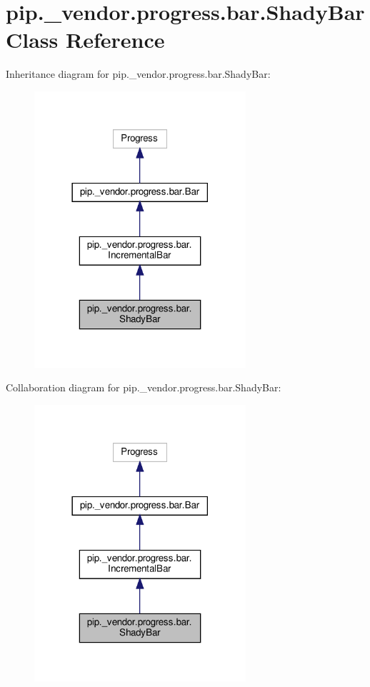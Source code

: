 \hypertarget{classpip_1_1__vendor_1_1progress_1_1bar_1_1ShadyBar}{}\section{pip.\+\_\+vendor.\+progress.\+bar.\+Shady\+Bar Class Reference}
\label{classpip_1_1__vendor_1_1progress_1_1bar_1_1ShadyBar}


Inheritance diagram for pip.\+\_\+vendor.\+progress.\+bar.\+Shady\+Bar\+:
\nopagebreak
\begin{figure}[H]
\begin{center}
\leavevmode
\includegraphics[width=222pt]{classpip_1_1__vendor_1_1progress_1_1bar_1_1ShadyBar__inherit__graph}
\end{center}
\end{figure}


Collaboration diagram for pip.\+\_\+vendor.\+progress.\+bar.\+Shady\+Bar\+:
\nopagebreak
\begin{figure}[H]
\begin{center}
\leavevmode
\includegraphics[width=222pt]{classpip_1_1__vendor_1_1progress_1_1bar_1_1ShadyBar__coll__graph}
\end{center}
\end{figure}
